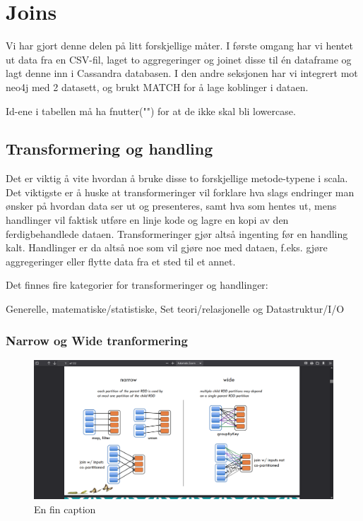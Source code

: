 \section{Joins}
Vi har gjort denne delen på litt forskjellige måter. I første omgang har vi hentet ut data fra en CSV-fil, laget to aggregeringer og joinet disse til én dataframe og lagt denne inn i Cassandra databasen. I den andre seksjonen har vi integrert mot neo4j med 2 datasett, og brukt MATCH for å lage koblinger i dataen.


Id-ene i tabellen må ha fnutter("") for at de ikke skal bli lowercase.



\subsection{Transformering og handling}
Det er viktig å vite hvordan å bruke disse to forskjellige metode-typene i scala. Det viktigste er å huske at transformeringer vil forklare hva slags endringer man ønsker på hvordan data ser ut og presenteres, samt hva som hentes ut, mens handlinger vil faktisk utføre en linje kode og lagre en kopi av den ferdigbehandlede dataen. Transformeringer gjør altså ingenting før en handling kalt. Handlinger er da altså noe som vil gjøre noe med dataen, f.eks. gjøre aggregeringer eller flytte data fra et sted til et annet. 


Det finnes fire kategorier for transformeringer og handlinger:


Generelle, matematiske/statistiske, Set teori/relasjonelle og Datastruktur/I/O


\subsubsection{Narrow og Wide tranformering}

\begin{figure}[H]
    \centering
    \includegraphics[scale=0.3]{images/transformActionPic.png}
    \caption{En fin caption}
  \end{figure}

